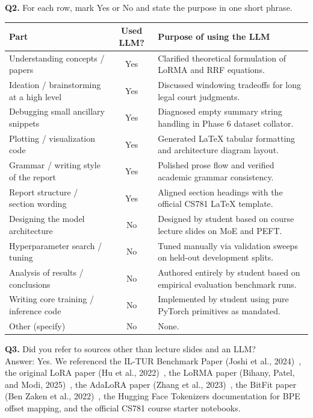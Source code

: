 \documentclass[11pt, oneside]{article}
\begin{document}
\noindent
\textbf{Q2.} For each row, mark Yes or No and state the purpose in one short phrase.
\begin{table}[H]
\centering
\small
\begin{tabular}{>{\raggedright\arraybackslash}p{4.8cm}|c|>{\raggedright\arraybackslash}p{7.8cm}}
\toprule
\textbf{Part} & \textbf{Used LLM?} & \textbf{Purpose of using the LLM} \\
\midrule
Understanding concepts / papers & Yes & Clarified theoretical formulation of LoRMA and RRF equations. \\
Ideation / brainstorming at a high level & Yes & Discussed windowing tradeoffs for long legal court judgments. \\
Debugging small ancillary snippets & Yes & Diagnosed empty summary string handling in Phase 6 dataset collator. \\
Plotting / visualization code & Yes & Generated LaTeX tabular formatting and architecture diagram layout. \\
Grammar / writing style of the report & Yes & Polished prose flow and verified academic grammar consistency. \\
Report structure / section wording & Yes & Aligned section headings with the official CS781 LaTeX template. \\
Designing the model architecture & No & Designed by student based on course lecture slides on MoE and PEFT. \\
Hyperparameter search / tuning & No & Tuned manually via validation sweeps on held-out development splits. \\
Analysis of results / conclusions & No & Authored entirely by student based on empirical evaluation benchmark runs. \\
Writing core training / inference code & No & Implemented by student using pure PyTorch primitives as mandated. \\
Other (specify) & No & None. \\
\bottomrule
\end{tabular}
\end{table}

\medskip
\noindent
\textbf{Q3.} Did you refer to sources other than lecture slides and an LLM? \\[0.4em]
Answer: Yes. We referenced the IL-TUR Benchmark Paper (Joshi et al., 2024)~\cite{joshi2024iltur}, the original LoRA paper (Hu et al., 2022)~\cite{hu2021lora}, the LoRMA paper (Bihany, Patel, and Modi, 2025)~\cite{bihany2025lorma}, the AdaLoRA paper (Zhang et al., 2023)~\cite{zhang2023adalora}, the BitFit paper (Ben Zaken et al., 2022)~\cite{ben2022bitfit}, the Hugging Face Tokenizers documentation for BPE offset mapping, and the official CS781 course starter notebooks.
\medskip
\end{document}

